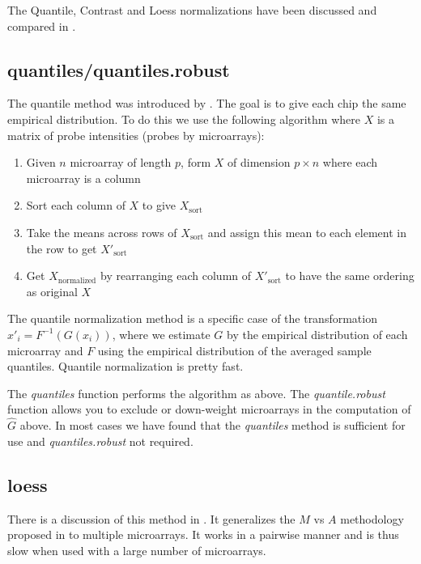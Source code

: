 The Quantile, Contrast and Loess normalizations have been discussed and compared in \cite{PMID_12538238}.

\subsection{quantiles/quantiles.robust}

The quantile method was introduced by \cite{PMID_12538238}. The goal is to give each chip the same empirical distribution. To do this we use the following algorithm where $X$ is a matrix of probe intensities (probes by microarrays):

\begin{enumerate}
\item Given $n$ microarray of length $p$, form $X$  of dimension $p \times n$  where
each microarray is a column
\item Sort each column of $X$ to give $X_{\mbox{sort}}$
\item Take the means across rows of $X_{\mbox{sort}}$ and assign this mean to each element in the row to get $X'_{\mbox{sort}}$
\item Get $X_{\mbox{normalized}}$ by rearranging each column of $X'_{\mbox{sort}}$ to have the same ordering as original $X$
\end{enumerate}

The quantile normalization method is a specific case of the transformation $x'_{i} = F^{-1}\left(G\left(x_{i}\right)\right)$, where we estimate $G$ by the empirical distribution of each microarray and $F$ using the empirical distribution of the averaged sample quantiles.  Quantile normalization is pretty fast.

The \emph{quantiles} function performs the algorithm as above. The \emph{quantile.robust} function allows you to exclude or down-weight microarrays in the computation of $\hat G$ above. In most cases we have found that the \emph{quantiles} method is sufficient for use and \emph{quantiles.robust} not required.

\subsection{loess}

There is a discussion of this method in \cite{PMID_12538238}. It generalizes the $M$ vs $A$ methodology proposed in \cite{Dudoit:2002} to multiple microarrays. It works in a pairwise manner and is thus slow when used with a large number of microarrays.

